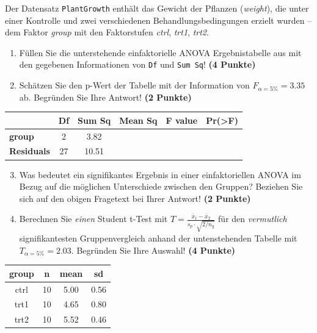 \documentclass[a4paper, 10pt]{scrartcl}\usepackage[]{graphicx}\usepackage[]{color}
\newenvironment{knitrout}{}{} %
\begin{document}
Der Datensatz \texttt{PlantGrowth} enth{\"a}lt das Gewicht der Pflanzen
(\textit{weight}), die unter einer Kontrolle und zwei verschiedenen
Behandlungsbedingungen erzielt wurden -- dem Faktor \textit{group} mit den
Faktorstufen \textit{ctrl}, \textit{trt1}, \textit{trt2}.



\begin{enumerate}
\item Füllen Sie die unterstehende einfaktorielle ANOVA Ergebnistabelle aus
  mit den gegebenen Informationen von \texttt{Df} und \texttt{Sum Sq}!
  \textbf{(4 Punkte)}
\item Schätzen Sie den p-Wert der Tabelle mit der Information von
  $F_{\alpha = 5\%} = 3.35$ ab. Begründen Sie Ihre
  Antwort! \textbf{(2 Punkte)}
\end{enumerate}

\vspace{1Ex}

\begin{center}
  \Large
  \begin{tabular}{l|c|c|c|c|c}
     & \textbf{Df} & \textbf{Sum Sq} & \textbf{Mean Sq} & \textbf{F value} & \textbf{Pr(>F)} \strut\\
    \hline
   \textbf{group}  & 2 & 3.82 &  &  &  \strut\\
    \hline
   \textbf{Residuals}  & 27 & 10.51 &  &  &  \strut\\
  \end{tabular}
\end{center}

\vspace{1Ex}

\begin{enumerate}
  \setcounter{enumi}{2}
\item Was bedeutet ein signifikantes Ergebnis in einer einfaktoriellen
  ANOVA im Bezug auf die möglichen Unterschiede zwischen den Gruppen? Beziehen Sie sich auf den obigen Fragetext bei Ihrer Antwort!
  \textbf{(2 Punkte)}
\item Berechnen Sie \textit{einen} Student t-Test mit $T = \tfrac{\bar{x}_1
  - \bar{x}_2}{s_p \cdot \sqrt{2/n_g}}$ für den \textit{vermutlich}
  signifikantesten Gruppenvergleich anhand der untenstehenden Tabelle mit
  $T_{\alpha = 5\%} = 2.03$. Begründen Sie Ihre Auswahl! \textbf{(4 Punkte)}
\end{enumerate}

\begin{knitrout}
\color{fgcolor}\begin{table}[!h]
\centering
\begin{tabular}{cccc}
\toprule
group & n & mean & sd\\
\midrule
ctrl & 10 & 5.00 & 0.56\\
trt1 & 10 & 4.65 & 0.80\\
trt2 & 10 & 5.52 & 0.46\\
\bottomrule
\end{tabular}
\end{table}

\end{knitrout}
\end{document}
